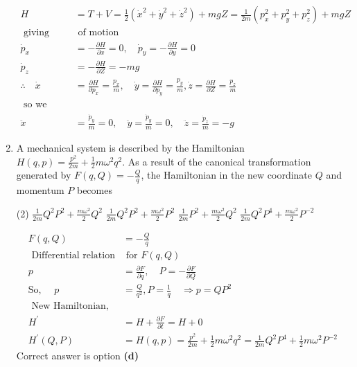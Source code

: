 \begin{enumerate}
\begin{answer}
\begin{align*}
		H&=T+V=\frac{1}{2}\left(\dot{x}^{2}+\dot{y}^{2}+\dot{z}^{2}\right)+m g Z=\frac{1}{2 m}\left(p_{x}^{2}+p_{y}^{2}+p_{z}^{2}\right)+m g Z \\
		\text { giving equations }&\text{ of motion}\\
		\dot{p}_{x}&=-\frac{\partial H}{\partial x}=0, \quad \dot{p}_{y}=-\frac{\partial H}{\partial y}=0\\
		\dot{p}_{z}&=-\frac{\partial H}{\partial Z}=-m g\\
		\therefore \quad \dot{x}&=\frac{\partial H}{\partial p_{x}}=\frac{p_{x}}{m}, \quad \dot{y}=\frac{\partial H}{\partial p_{y}}=\frac{p_{y}}{m}, \dot{z}=\frac{\partial H}{\partial Z}=\frac{p_{z}}{m}\\
	\text{ so we finally get,}\\
		\ddot{x}&=\frac{\dot{p}_{y}}{m}=0, \quad \ddot{y}=\frac{\dot{p}_{y}}{m}=0, \quad \ddot{z}=\frac{\dot{p}_{z}}{m}=-g
		\end{align*}
	\end{answer}
	\item A mechanical system is described by the Hamiltonian $H(q, p)=\frac{p^{2}}{2 m}+\frac{1}{2} m \omega^{2} q^{2}$. As a result of the canonical transformation generated by $F(q, Q)=-\frac{Q}{q}$, the Hamiltonian in the new coordinate $Q$ and momentum $P$ becomes
	 \begin{tasks}(2)
		\task[\textbf{a.}]$\frac{1}{2 m} Q^{2} P^{2}+\frac{m \omega^{2}}{2} Q^{2}$
		\task[\textbf{b.}]$\frac{1}{2 m} Q^{2} P^{2}+\frac{m \omega^{2}}{2} P^{2}$
		\task[\textbf{c.}]$\frac{1}{2 m} P^{2}+\frac{m \omega^{2}}{2} Q^{2}$
		\task[\textbf{d.}] $\frac{1}{2 m} Q^{2} P^{4}+\frac{m \omega^{2}}{2} P^{-2}$
	\end{tasks}
	\begin{answer}
		\begin{align*}
		F(q, Q)&=-\frac{Q}{q}\\
	\text{	Differential relation}&\text{ for $F(q, Q)$}\\
		p&=\frac{\partial F}{\partial q}, \quad P=-\frac{\partial F}{\partial Q}\\
		\text{So, }\quad p&=\frac{Q}{q^{2}}, P=\frac{1}{q} \quad \Rightarrow p=Q P^{2}\\
	\text{	New Hamiltonian,}\\
		H^{\prime}&=H+\frac{\partial F}{\partial t}=H+0\\
		H^{\prime}(Q, P)&=H(q, p)=\frac{p^{2}}{2 m}+\frac{1}{2} m \omega^{2} q^{2}=\frac{1}{2 m} Q^{2} P^{4}+\frac{1}{2} m \omega^{2} P^{-2}
		\end{align*}
		Correct answer is option \textbf{(d)}
	\end{answer}
\end{enumerate}

